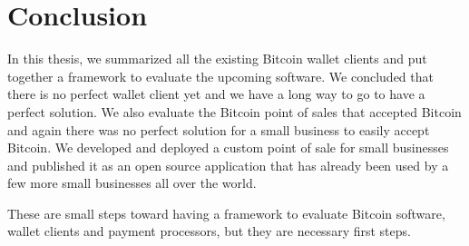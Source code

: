 
\chapter{Conclusion}

In this thesis, we summarized all the existing Bitcoin wallet clients and put together a framework to evaluate the upcoming software. We concluded that there is no perfect wallet client yet and we have a long way to go to have a perfect solution. We also evaluate the Bitcoin point of sales that accepted Bitcoin and again there was no perfect solution for a small business to easily accept Bitcoin. We developed and deployed a custom point of sale for small businesses and published it as an open source application that has already been used by a few more small businesses all over the world.

These are small steps toward having a framework to evaluate Bitcoin software, wallet clients and payment processors, but they are necessary first steps.

 